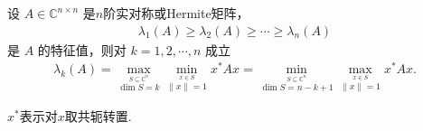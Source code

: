 \documentclass[../../main.tex]{subfiles}%
\begin{document}
\begin{theorem}\label{theorem:Courant-Fischer的Hermite特征值极大极小原理}
设 $A\in\mathbb{C}^{n\times n}$ 是$n$阶实对称或Hermite矩阵，
\begin{align*}
\lambda_1(A)\geqslant \lambda_2(A)\geqslant \cdots \geqslant \lambda_n(A)
\end{align*}
是 $A$ 的特征值，则对 $k=1,2,\cdots,n$ 成立
\begin{align}
\lambda_k(A)=\max_{\stackrel{S\subseteq \mathbb{C}^n}{\dim S=k}}\min_{\stackrel{x\in S}{\|x\|=1}} x^*Ax = \min_{\stackrel{S\subseteq \mathbb{C}^n}{\dim S=n-k+1}}\max_{\stackrel{x\in S}{\|x\|=1}} x^*Ax.
\label{eq:CF}
\end{align}
\end{theorem}
\begin{remark}
$x^*$表示对$x$取共轭转置.
\end{remark}
\end{document}
